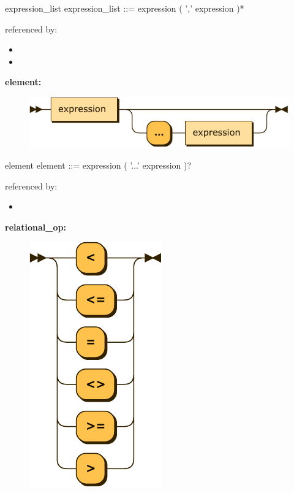 \documentclass[10pt,a4paper,twoside]{article}
\providecommand{\tightlist}{%
  \setlength{\itemsep}{0pt}\setlength{\parskip}{0pt}}
\newcounter{grammarbox}[section]
\begin{document}
\begin{grammarbox}{expression\_list}
\vspace{0.5em}
expression\_list
         ::= expression ( ',' expression )*
\end{grammarbox}

referenced by:

\begin{itemize}
\tightlist
\item
\item
\end{itemize}

\textbf{element:}

\begin{figure}[H]
\centering
\includegraphics{diagram/element.pdf}

\end{figure}

\begin{grammarbox}{element}
\vspace{0.5em}
element  ::= expression ( '...' expression )?
\end{grammarbox}

referenced by:

\begin{itemize}
\tightlist
\item
\end{itemize}

\textbf{relational\_op:}

\begin{figure}[H]
\centering
\includegraphics{diagram/relational_op.pdf}

\end{figure}
\end{document}
